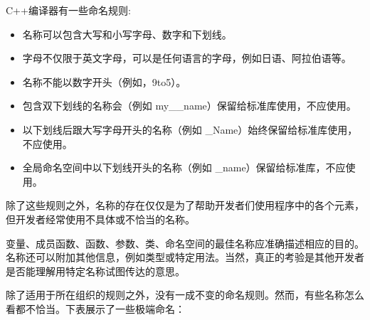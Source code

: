 
C++编译器有一些命名规则:

\begin{itemize}
\item
名称可以包含大写和小写字母、数字和下划线。

\item
字母不仅限于英文字母，可以是任何语言的字母，例如日语、阿拉伯语等。

\item
名称不能以数字开头（例如，9to5）。

\item
包含双下划线的名称会（例如 my\_\_name）保留给标准库使用，不应使用。

\item
以下划线后跟大写字母开头的名称（例如 \_Name）始终保留给标准库使用，不应使用。

\item
全局命名空间中以下划线开头的名称（例如 \_name）保留给标准库，不应使用。
\end{itemize}

除了这些规则之外，名称的存在仅仅是为了帮助开发者们使用程序中的各个元素，但开发者经常使用不具体或不恰当的名称。


变量、成员函数、函数、参数、类、命名空间的最佳名称应准确描述相应的目的。名称还可以附加其他信息，例如类型或特定用法。当然，真正的考验是其他开发者是否能理解用特定名称试图传达的意思。

除了适用于所在组织的规则之外，没有一成不变的命名规则。然而，有些名称怎么看都不恰当。下表展示了一些极端命名：

